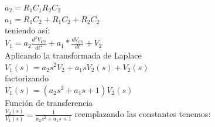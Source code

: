 \documentclass[
	12pt, %
]{fphw}
\begin{document}
$a_{2} = R_{1}C_{1}R_{2}C_{2}$ \\
$a_{1} = R_{1}C_{2}+R_{1}C_{2}+R_{2}C_{2}$ \\

teniendo así: \\

$V_{1} = a_{2} \frac{d^{2}V_{C2}}{dt^{2}} + a_{1}*\frac{dV_{C1}}{dt} + V_{2}$ \\

Aplicando la transformada de Laplace \\

$V_{1}(s) = a_{2}s^{2}V_{2} + a_{1}sV_{2}(s) + V_{2}(s)$ \\

factorizando \\

$V_{1}(s) = (a_{2}s^{2}+a_{1}s+1)V_{2}(s)$ \\

Función de transferencia \\

$\frac{V_{2}(s)}{V_{1}(s)} =  \frac{1}{a_{2}s^{2}+a_{1}s+1}$ reemplazando las constantes tenemos: \\

\end{document}
